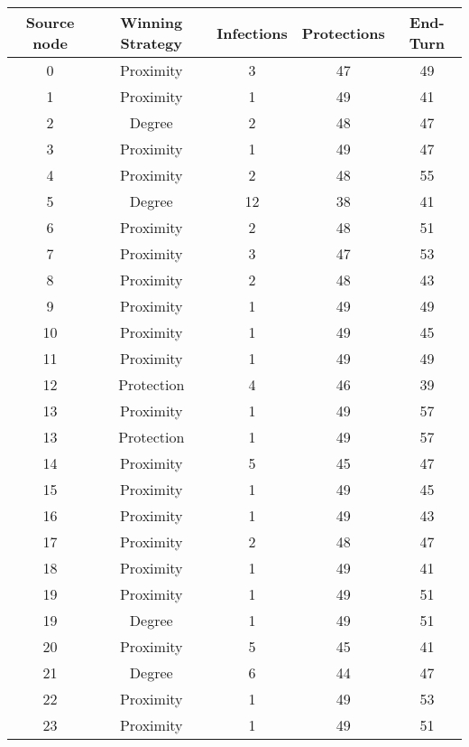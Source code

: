 \documentclass[results.tex]{subfiles}
\begin{document}
\begin{center}
  \begin{tabular}{| c || c | c | c | c |}
    \hline
    {\bfseries Source node} & {\bfseries Winning Strategy} & {\bfseries Infections} & {\bfseries Protections} & {\bfseries End-Turn} \\  %
    \hline\hline
    0 & Proximity & 3 & 47 & 49 \\ 
    \hline
    1 & Proximity & 1 & 49 & 41 \\ 
    \hline
    2 & Degree & 2 & 48 & 47 \\ 
    \hline
    3 & Proximity & 1 & 49 & 47 \\ 
    \hline
    4 & Proximity & 2 & 48 & 55 \\ 
    \hline
    5 & Degree & 12 & 38 & 41 \\ 
    \hline
    6 & Proximity & 2 & 48 & 51 \\ 
    \hline
    7 & Proximity & 3 & 47 & 53 \\ 
    \hline
    8 & Proximity & 2 & 48 & 43 \\ 
    \hline
    9 & Proximity & 1 & 49 & 49 \\ 
    \hline
    10 & Proximity & 1 & 49 & 45 \\ 
    \hline
    11 & Proximity & 1 & 49 & 49 \\ 
    \hline
    12 & Protection & 4 & 46 & 39 \\ 
    \hline
    13 & Proximity & 1 & 49 & 57 \\ 
    \hline
    13 & Protection & 1 & 49 & 57 \\ 
    \hline
    14 & Proximity & 5 & 45 & 47 \\ 
    \hline
    15 & Proximity & 1 & 49 & 45 \\ 
    \hline
    16 & Proximity & 1 & 49 & 43 \\ 
    \hline
    17 & Proximity & 2 & 48 & 47 \\ 
    \hline
    18 & Proximity & 1 & 49 & 41 \\ 
    \hline
    19 & Proximity & 1 & 49 & 51 \\ 
    \hline
    19 & Degree & 1 & 49 & 51 \\ 
    \hline
    20 & Proximity & 5 & 45 & 41 \\ 
    \hline
    21 & Degree & 6 & 44 & 47 \\ 
    \hline
    22 & Proximity & 1 & 49 & 53 \\ 
    \hline
    23 & Proximity & 1 & 49 & 51 \\ 

\end{tabular}
\end{center}
\end{document}
